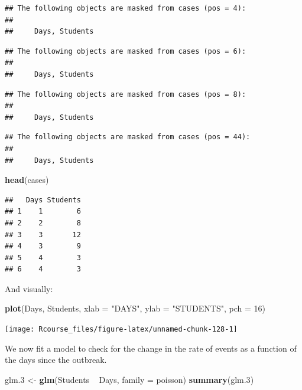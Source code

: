 \documentclass[]{book}
\newenvironment{Shaded}{\begin{snugshade}}{\end{snugshade}}
\newcommand{\KeywordTok}[1]{\textcolor[rgb]{0.13,0.29,0.53}{\textbf{{#1}}}}
\newcommand{\DataTypeTok}[1]{\textcolor[rgb]{0.13,0.29,0.53}{{#1}}}
\newcommand{\DecValTok}[1]{\textcolor[rgb]{0.00,0.00,0.81}{{#1}}}
\newcommand{\FloatTok}[1]{\textcolor[rgb]{0.00,0.00,0.81}{{#1}}}
\newcommand{\StringTok}[1]{\textcolor[rgb]{0.31,0.60,0.02}{{#1}}}
\newcommand{\NormalTok}[1]{{#1}}
\theoremstyle{definition}
\theoremstyle{definition}
\theoremstyle{remark}
\begin{document}
\begin{verbatim}
## The following objects are masked from cases (pos = 4):
## 
##     Days, Students
\end{verbatim}

\begin{verbatim}
## The following objects are masked from cases (pos = 6):
## 
##     Days, Students
\end{verbatim}

\begin{verbatim}
## The following objects are masked from cases (pos = 8):
## 
##     Days, Students
\end{verbatim}

\begin{verbatim}
## The following objects are masked from cases (pos = 44):
## 
##     Days, Students
\end{verbatim}

\begin{Shaded}
\begin{Highlighting}[]
\KeywordTok{head}\NormalTok{(cases) }
\end{Highlighting}
\end{Shaded}

\begin{verbatim}
##   Days Students
## 1    1        6
## 2    2        8
## 3    3       12
## 4    3        9
## 5    4        3
## 6    4        3
\end{verbatim}

And visually:

\begin{Shaded}
\begin{Highlighting}[]
\KeywordTok{plot}\NormalTok{(Days, Students, }\DataTypeTok{xlab =} \StringTok{"DAYS"}\NormalTok{, }\DataTypeTok{ylab =} \StringTok{"STUDENTS"}\NormalTok{, }\DataTypeTok{pch =} \DecValTok{16}\NormalTok{)}
\end{Highlighting}
\end{Shaded}

\texttt{[image: Rcourse\_files/figure-latex/unnamed-chunk-128-1]}

We now fit a model to check for the change in the rate of events as a
function of the days since the outbreak.

\begin{Shaded}
\begin{Highlighting}[]
\NormalTok{glm}\FloatTok{.3} \NormalTok{<-}\StringTok{ }\KeywordTok{glm}\NormalTok{(Students ~}\StringTok{ }\NormalTok{Days, }\DataTypeTok{family =} \NormalTok{poisson)}
\KeywordTok{summary}\NormalTok{(glm}\FloatTok{.3}\NormalTok{)}
\end{Highlighting}
\end{Shaded}
\end{document}
